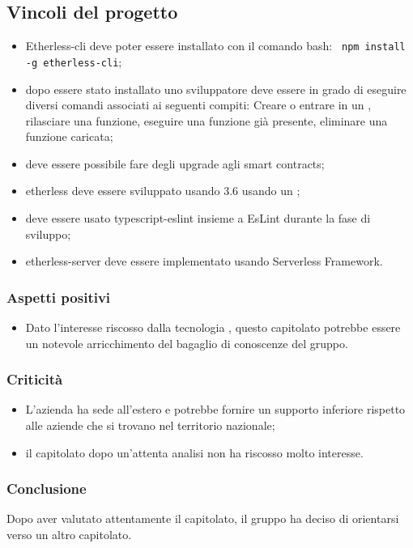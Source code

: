   \subsection{Vincoli del progetto}
    	   \begin{itemize}
    			\item Etherless-cli deve poter essere installato con il comando bash:
    			\verb! npm install -g etherless-cli!;

    			\item dopo essere stato installato uno sviluppatore deve essere in grado di eseguire diversi comandi associati ai seguenti compiti: Creare o entrare in un  , rilasciare una funzione, eseguire una funzione già presente, eliminare una funzione caricata;
    			\item deve essere possibile fare degli upgrade agli smart contracts;
    			\item etherless deve essere sviluppato usando  3.6 usando un ;
    			\item deve essere usato typescript-eslint insieme a EsLint durante la fase di sviluppo;
    			\item etherless-server deve essere implementato usando Serverless Framework.
	 \end{itemize}


    \subsubsection{Aspetti positivi}
	    \begin{itemize}
    			\item Dato l'interesse riscosso dalla tecnologia , questo capitolato potrebbe essere un notevole arricchimento del bagaglio di conoscenze del gruppo.
    	   \end{itemize}
    \subsubsection{Criticità}
    	   \begin{itemize}
    			\item L'azienda ha sede all'estero e potrebbe fornire un supporto inferiore rispetto alle aziende che si trovano nel territorio nazionale;
    			\item il capitolato dopo un'attenta analisi non ha riscosso molto interesse.
    	   \end{itemize}
    \subsubsection{Conclusione}
	Dopo aver valutato attentamente il capitolato, il gruppo ha deciso di orientarsi verso un altro capitolato.
